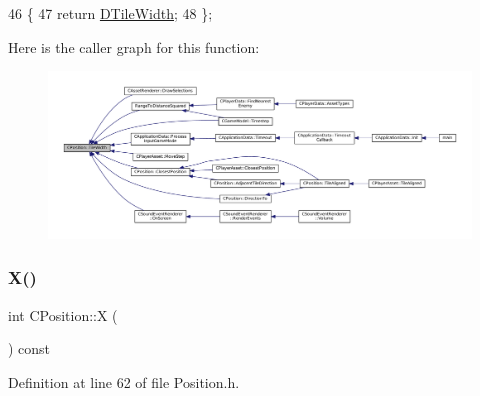 \begin{DoxyCode}
46                               \{
47             \textcolor{keywordflow}{return} \hyperlink{classCPosition_ac17d12fb5d35fcf62d63bb42e8cf7ed6}{DTileWidth};  
48         \};
\end{DoxyCode}
Here is the caller graph for this function\+:
\nopagebreak
\begin{figure}[H]
\begin{center}
\leavevmode
\includegraphics[width=350pt]{classCPosition_a27a7a8b9a5541da0aa8d97d785650fb8_icgraph}
\end{center}
\end{figure}
\hypertarget{classCPosition_a9a6b94d3b91df1492d166d9964c865fc}{}\label{classCPosition_a9a6b94d3b91df1492d166d9964c865fc} 
\subsubsection{\texorpdfstring{X()}{X()}\hspace{0.1cm}{\footnotesize\ttfamily [1/2]}}
{\footnotesize\ttfamily int C\+Position\+::X (\begin{DoxyParamCaption}{ }\end{DoxyParamCaption}) const\hspace{0.3cm}{\ttfamily [inline]}}



Definition at line 62 of file Position.\+h.


